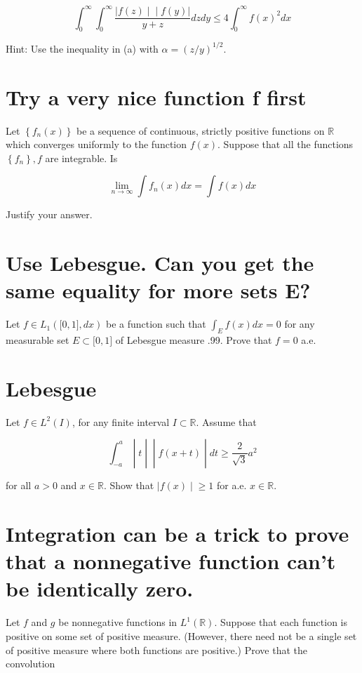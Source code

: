 \[\int_{0}^{\infty}\int_{0}^{\infty}\frac{\left. |f(z) \middle| \middle| f(y)| \right.}{y + z}dzdy \leq 4\int_{0}^{\infty}f(x)^{2}dx\]

Hint: Use the inequality in (a) with \(\alpha = (z/y)^{1/2}\).

\chapter{Try a very nice function f first}\label{try-a-very-nice-function-f-first}

Let \(\left\{ {f_{n}(x)} \right\}\) be a sequence of continuous, strictly positive functions on \(\mathbb{R}\) which converges uniformly to the function \(f(x)\). Suppose that all the functions \(\left\{ f_{n} \right\},f\) are integrable. Is

\[\lim\limits_{n\rightarrow\infty}\int f_{n}(x)dx = \int f(x)dx\]

Justify your answer.

\chapter{Use Lebesgue. Can you get the same equality for more sets E?}

Let \(f \in L_{1}(\lbrack 0,1\rbrack,dx)\) be a function such that \(\int_{E}f(x)dx = 0\) for any measurable set \(E \subset \lbrack 0,1\rbrack\) of Lebesgue measure .99. Prove that \(f = 0\) a.e.

\chapter{Lebesgue}\label{lebesgue}

Let \(f \in L^{2}(I)\), for any finite interval \(I \subset \mathbb{R}\). Assume that

\[\left. \int_{- a}^{a} \middle| t \middle| \middle| f(x + t) \middle| dt \geq \frac{2}{\sqrt{3}}a^{2} \right.\]

for all \(a > 0\) and \(x \in \mathbb{R}\). Show that \(\left. |f(x) \middle| \geq 1 \right.\) for a.e. \(x \in \mathbb{R}\).

\chapter{Integration can be a trick to prove that a nonnegative function can't be identically zero.}

Let \(f\) and \(g\) be nonnegative functions in \(L^{1}(\mathbb{R})\). Suppose that each function is positive on some set of positive measure. (However, there need not be a single set of positive measure where both functions are positive.) Prove that the convolution

